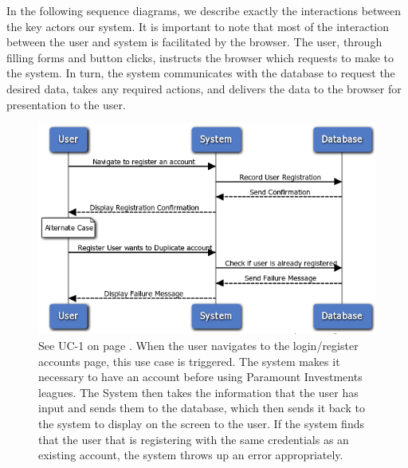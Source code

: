 In the following sequence diagrams, we describe exactly the interactions between the key
actors our system. It is important to note that most of the interaction between the
user and system is facilitated by the browser. The user, through filling forms and button
clicks, instructs the browser which requests to make to the system.
In turn, the system communicates with the database to request the desired data,
takes any required actions, and delivers the data to the browser for presentation to the user. \\

\begin{figure}[H]
\centering
\includegraphics[width=5.5in]{./img/uc1.png}
\caption{See UC-1 on page \pageref{UC-1}. When the user navigates to the login/register accounts
page, this use case
is triggered. The system makes it necessary to have an account before using
Paramount Investments leagues. The System then takes the information that the
user has input and sends them to the database, which then sends it back to the
system to display on the screen to the user. If the system finds that the user that is
registering with the same credentials as an existing account, the system throws up
an error appropriately.}
\end{figure}

